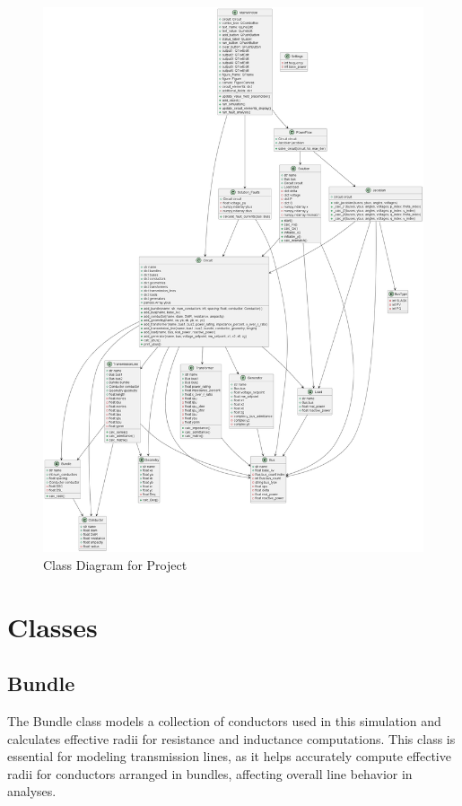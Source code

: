\documentclass{article}
\begin{document}
	\begin{figure}[H]
		\centering
		\includegraphics[scale=0.25]{../out/circuit/circuit.png}	
		\caption{Class Diagram for Project}
	\end{figure}
	
	\section{Classes}
	
	\subsection{Bundle}
	The Bundle class models a collection of conductors used in this simulation and calculates effective radii for resistance and inductance computations. This class is essential for modeling transmission lines, as it helps accurately compute effective radii for conductors arranged in bundles, affecting overall line behavior in analyses.
	
\end{document}
